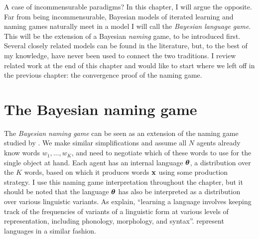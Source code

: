 \documentclass{../src/bcthesispart}
\begin{document}
 
 
 

A case of incommensurable paradigms?
In this chapter, I will argue the opposite.
Far from being incommensurable, Bayesian models of iterated learning and naming games naturally meet in a model I will call the \emph{Bayesian language game}.
This will be the extension of a Bayesian \emph{naming} game, to be introduced first.
Several closely related models can be found in the literature, but, to the best of my knowledge, have never been used to connect the two traditions.
I review related work at the end of this chapter and would like to start where we left off in the previous chapter: the convergence proof of the naming game.




\section{The Bayesian naming game}


The \emph{Bayesian naming game} can be seen as an extension of the naming game studied by \textcite{DeVylder2006}.
We make similar simplifications and assume all $N$ agents already know words $w_1, \dots, w_K$, and need to negotiate which of these words to use for the single object at hand.
Each agent has an internal language $\boldsymbol{\mathbf{\theta}}$, a distribution over the $K$ words, based on which it produces words $\boldsymbol{\mathbf{x}}$ using some production strategy.
I use this naming game interpretation throughout the chapter, but it should be noted that the language $\boldsymbol{\mathbf{\theta}}$ has also be interpreted as a distribution over various linguistic variants.
As \textcite{Reali2010} explain, “learning a language involves keeping track of the frequencies of variants of a linguistic form at various levels of representation, including phonology, morphology, and syntax”.
\textcite{Ferdinand2009} represent languages in a similar fashion.
\end{document}
